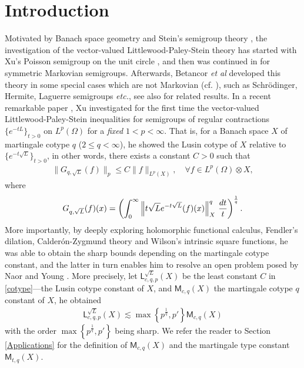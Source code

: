 \documentclass[oneside,english,a4wide]{amsart}
\numberwithin{equation}{section}
\numberwithin{figure}{section}
\theoremstyle{plain}
\theoremstyle{plain}
\theoremstyle{definition}
\theoremstyle{plain}
\theoremstyle{remark}
\theoremstyle{definition}
\theoremstyle{remark}
\theoremstyle{definition}
\newcommand{\8}{+\infty}
\renewcommand{\1}{\mathbbm{1}}
\newcommand\norm[1]{ \left\| #1 \right\| }
\newcommand\sk[1]{ \left( #1 \right) }
\newcommand\lk[1]{ \left\{ #1 \right\} }
\renewcommand\d{{\rm d}}
\begin{document}
\section{Introduction}\label{Introduction}
{Motivated by Banach space geometry \cite{Pi1975,Pi1986} and Stein's semigroup theory \cite{Stein1970}, the investigation of the vector-valued Littlewood-Paley-Stein theory has started with Xu's Poisson semigroup on the unit circle \cite{Xu1998}, and then was continued in \cite{MTX, Xu2015 ,Xu2020} for symmetric Markovian semigroups. Afterwards, Betancor {\it et al} developed this theory in some special cases which are not Markovian (cf. \cite{Betancor2007, Betancor2011, Betancor2011area,betancor2013}), such as Schr\"odinger, Hermite, Laguerre semigroups {\it etc.}, see also \cite{Abu2011,  Betancor2016, Betancor2020, Hytonen2007,Ouyang2010, Torrea2014, Harboure2003} for related results}. 
In a recent remarkable paper \cite{Xu2021}, Xu investigated for the first time the vector-valued Littlewood-Paley-Stein inequalities for semigroups of regular contractions $\{e^{-tL}\}_{t>0}$ on $L^p(\Omega)$ for a {\it fixed} $1 < p < \infty$. That is, for a Banach space $X$ of {martingale cotype} $q$ ($2 \leq q < \infty$), he showed the Lusin cotype of $X$ relative to $\{e^{-t\sqrt{L}}\}_{t>0}$, in other words, there exists a constant $C>0$ such that 
\begin{align}\label{cotype}
\|G_{q,\sqrt{L}}(f)\|_{p}\leq C\|f\|_{L^p(X)},\quad\forall f\in L^p(\Omega)\otimes X,
\end{align}
where 
$$G_{q,\sqrt{L}}(f)(x)=\sk{\int_0^{\infty} \norm{t\sqrt{L}{e^{-t\sqrt{L}}} (f)(x) }_X^q \,\frac{\d t}{t}}^{\frac{1}{q}}.$$
More importantly, by deeply exploring holomorphic functional calculus, Fendler's dilation, Calder\'on-Zygmund theory and Wilson's intrinsic square functions, he was able to obtain the sharp bounds depending on the martingale cotype constant, and the latter in turn enables him to resolve an open problem posed by Naor and Young \cite{Naor2022}. More precisely, let $\mathsf{L}^{\sqrt{L}}_{c,q, p}(X)$ be the least constant $C$ in \eqref{cotype}---the Lusin cotype constant of $X$, and $\mathsf{M}_{c,q}(X)$ the martingale cotype $q$ constant of $X$, he obtained
\begin{align}\label{cotypeconstant}  \mathsf{L}^{\sqrt{L}}_{c,q, p}(X) \lesssim \max\lk{ p^{\frac{1}{q}}, p' }\mathsf{M}_{c, q}(X)\end{align}
with the order $\max\lk{ p^{\frac{1}{q}}, p' }$ being sharp. We refer the reader to Section \ref{Applications} for the definition of $\mathsf{M}_{c, q}(X)$ and the martingale type constant $\mathsf{M}_{t, q}(X)$. 
\end{document}
